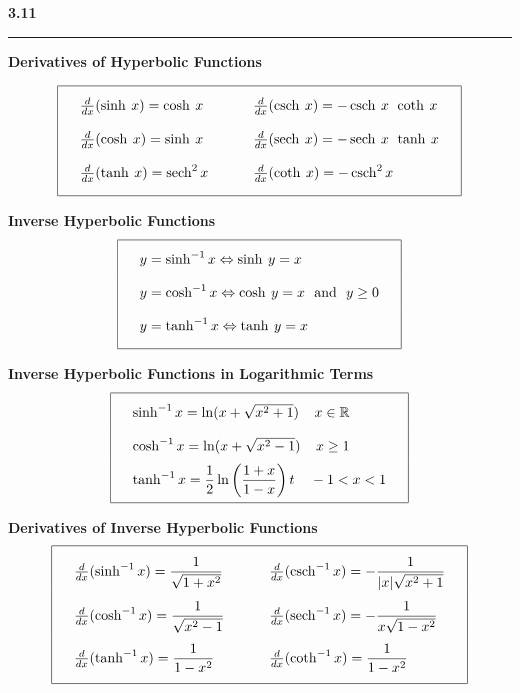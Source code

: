 \documentclass{article}
\DeclareMathOperator{\sech}{sech}
\DeclareMathOperator{\csch}{csch}
\begin{document}
\begin{center}
\Large\textbf{3.11}

\noindent\hfill\rule{0.3\textwidth}{.4pt}\hfill
\vspace{12pt}

\large\textbf{Derivatives of Hyperbolic Functions}
\begin{large}
\[\arraycolsep=16pt\def\arraystretch{2}
\begin{array}{| l l |}
	\hline
	\frac{d}{dx} (\sinh\> x) = \cosh\> x & \frac{d}{dx} (\csch\> x) = -\csch\> x \>\> \coth\> x \\
	\frac{d}{dx} (\cosh\> x) = \sinh\> x & \frac{d}{dx} (\sech\> x) = -\sech\> x \>\> \tanh\> x \\
	\frac{d}{dx} (\tanh\> x) = \sech^2 x & \frac{d}{dx} (\coth\> x) = -\csch^2 x \\
	[\medskipamount]	
	\hline
\end{array}
\]
\vspace{12pt}

\large\textbf{Inverse Hyperbolic Functions}
\[\arraycolsep=16pt\def\arraystretch{2}
\begin{array}{| l |}
	\hline
	y = \sinh^{-1} x \Leftrightarrow \sinh\> y = x \\
	y = \cosh^{-1} x \Leftrightarrow \cosh\> y = x \>\>\> \text{and} \>\>\> y \geq 0 \\
	y = \tanh^{-1} x \Leftrightarrow \tanh\> y = x \\
	[\medskipamount]	
	\hline
\end{array}
\]
\vspace{12pt}

\large\textbf{Inverse Hyperbolic Functions in Logarithmic Terms}
\[\arraycolsep=16pt\def\arraystretch{2}
\begin{array}{| l |}
	\hline
	\sinh^{-1} x = \ln(x+ \sqrt{x^2 + 1}) \>\>\>\>\> x \in \mathbb{R} \\
	\cosh^{-1} x = \ln(x + \sqrt{x^2 - 1}) \>\>\>\>\> x \geq 1 \\
	\tanh^{-1} x = \dfrac{1}{2} \ln \left( \dfrac{1+x}{1-x} \right)t \>\>\>\>\> -1 < x < 1 \\
	[\medskipamount]	
	\hline
\end{array}
\]
\vspace{12pt}

\large\textbf{Derivatives of Inverse Hyperbolic Functions}
\[\arraycolsep=16pt\def\arraystretch{2.5}
\begin{array}{| l l |}
	\hline
	\frac{d}{dx} (\sinh^{-1} x) = \dfrac{1}{\sqrt{1 + x^2}} & \frac{d}{dx} (\csch^{-1} x) = -\dfrac{1}{|x| \sqrt{x^2 + 1}} \\
	\frac{d}{dx} (\cosh^{-1} x) = \dfrac{1}{\sqrt{x^2 - 1}} & \frac{d}{dx} (\sech^{-1} x) = -\dfrac{1}{x \sqrt{1 - x^2}} \\
	\frac{d}{dx} (\tanh^{-1} x) = \dfrac{1}{1 - x^2} & \frac{d}{dx} (\coth^{-1} x) = \dfrac{1}{1 - x^2}\\
	[\medskipamount]	
	\hline
\end{array}
\]
\vspace{12pt}

\end{large}
\end{center}
\end{document}

